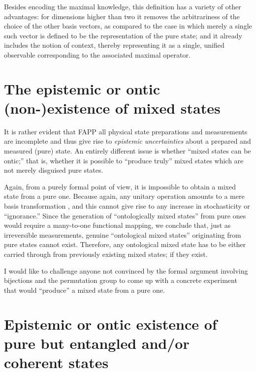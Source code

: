 \documentclass[%
 preprint,
 showpacs,
 showkeys,
 preprintnumbers,
 amsmath,amssymb,
 aps,
  pra,
  longbibliography,
 ]{revtex4-1}
\begin{document}
Besides encoding the maximal knowledge, this definition has a variety of other advantages:
for dimensions higher than two it removes the arbitrariness of the choice of the other basis vectors, as compared to the
case in which merely a single such vector is defined to be the representation of the pure state;
and it already includes the notion of context, thereby representing it as a single, unified observable
corresponding to the associated maximal operator.

\section{The epistemic or ontic (non-)existence of mixed states}

It is rather evident that FAPP all physical state preparations and measurements are incomplete and thus give rise to
{\em epistemic uncertainties} about a prepared and measured (pure) state.
An entirely different issue is whether ``mixed states can be ontic;'' that is,
whether it is possible to ``produce truly'' mixed states which
are not merely disguised pure states.

Again, from a purely formal point of view,
it is impossible to obtain a mixed state from a pure one.
Because again, any unitary operation amounts to a mere basis transformation \cite{Schwinger.60},
and this cannot give rise to any increase in stochasticity or ``ignorance.''
Since the generation of ``ontologically mixed states'' from pure ones would require a many-to-one functional mapping,
we conclude that, just as irreversible measurements, genuine ``ontological mixed states'' originating from pure states cannot exist.
Therefore, any ontological mixed state has to be either carried through from previously existing mixed states; if they exist.

I would like to challenge anyone not convinced by the formal argument involving bijections and the permutation group to come
up with a concrete experiment that would ``produce'' a mixed state from a pure one.





\section{Epistemic or ontic existence of pure but entangled and/or coherent states}
\end{document}
